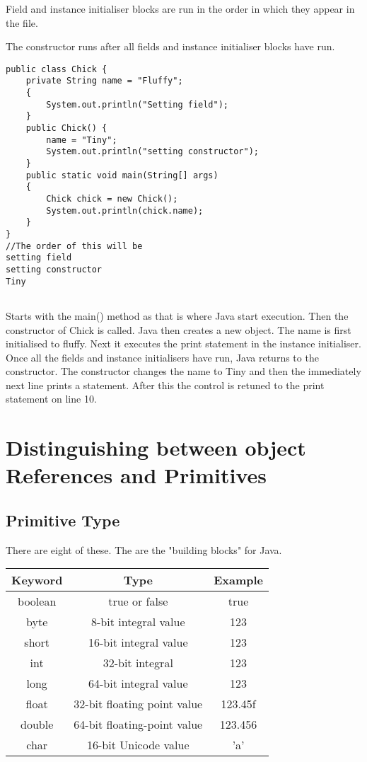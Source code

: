 \documentclass[a4paper]{report}   %
\begin{document}
Field and instance initialiser blocks are run in the order in which they appear in the file. 

The constructor runs after all fields and instance initialiser blocks have run.

\begin{lstlisting}
public class Chick {
	private String name = "Fluffy";
	{ 
		System.out.println("Setting field");
	}
	public Chick() {
		name = "Tiny";
		System.out.println("setting constructor");
	}
	public static void main(String[] args)
	{
		Chick chick = new Chick();
		System.out.println(chick.name);
	}
}
//The order of this will be
setting field
setting constructor
Tiny
		
\end{lstlisting}

Starts with the main() method as that is where Java start execution. Then the constructor of Chick is called. Java then creates a new object. The name is first initialised to fluffy. Next it executes the print statement in the instance initialiser. Once all the fields and instance initialisers have run, Java returns to the constructor. The constructor changes the name to Tiny and then the immediately next line prints a statement. After this the control is retuned to the print statement on line 10.\\

\section{Distinguishing between object References and Primitives}

\subsection{Primitive Type}

There are eight of these. The are the "building blocks" for Java.

\begin{center}
\begin{tabular}{| c | c | c |}
 \hline
 Keyword & Type & Example \\ 
 \hline
 boolean & true or false & true \\  
 byte & 8-bit integral value & 123 \\ 
 short & 16-bit integral value & 123 \\ 
 int & 32-bit integral & 123 \\ 
 long & 64-bit integral value & 123 \\  
 float & 32-bit floating point value & 123.45f \\ 
 double & 64-bit floating-point value & 123.456 \\
 char & 
 16-bit Unicode value & 'a' \\ 
 \hline
\end{tabular}
\end{center}
\end{document}
